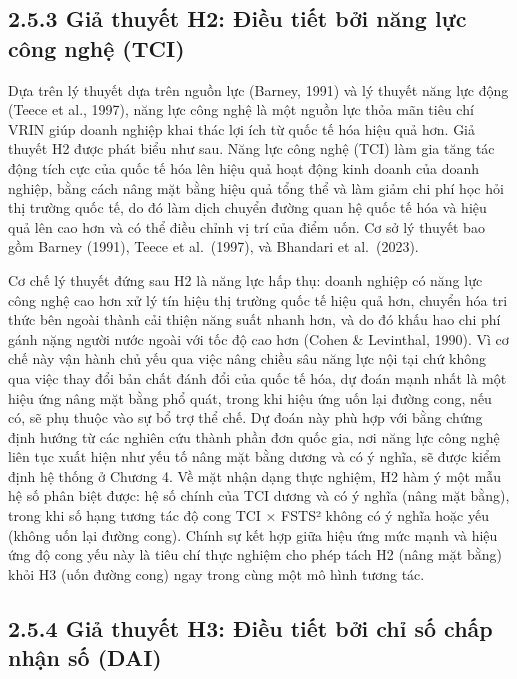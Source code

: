 \documentclass[
  a4paper,
  13pt]{extreport}
\begin{document}
\hypertarget{giux1ea3-thuyux1ebft-h2-ux111iux1ec1u-tiux1ebft-bux1edfi-nux103ng-lux1ef1c-cuxf4ng-nghux1ec7-tci}{%
\subsection{2.5.3 Giả thuyết H2: Điều tiết bởi năng lực công nghệ
(TCI)}\label{giux1ea3-thuyux1ebft-h2-ux111iux1ec1u-tiux1ebft-bux1edfi-nux103ng-lux1ef1c-cuxf4ng-nghux1ec7-tci}}

Dựa trên lý thuyết dựa trên nguồn lực (Barney, 1991) và lý thuyết năng
lực động (Teece et al., 1997), năng lực công nghệ là một nguồn lực thỏa
mãn tiêu chí VRIN giúp doanh nghiệp khai thác lợi ích từ quốc tế hóa
hiệu quả hơn. Giả thuyết H2 được phát biểu như sau. Năng lực công nghệ
(TCI) làm gia tăng tác động tích cực của quốc tế hóa lên hiệu quả hoạt
động kinh doanh của doanh nghiệp, bằng cách nâng mặt bằng hiệu quả tổng
thể và làm giảm chi phí học hỏi thị trường quốc tế, do đó làm dịch
chuyển đường quan hệ quốc tế hóa và hiệu quả lên cao hơn và có thể điều
chỉnh vị trí của điểm uốn. Cơ sở lý thuyết bao gồm Barney (1991), Teece
et al.~(1997), và Bhandari et al.~(2023).

Cơ chế lý thuyết đứng sau H2 là năng lực hấp thụ: doanh nghiệp có năng
lực công nghệ cao hơn xử lý tín hiệu thị trường quốc tế hiệu quả hơn,
chuyển hóa tri thức bên ngoài thành cải thiện năng suất nhanh hơn, và do
đó khấu hao chi phí gánh nặng người nước ngoài với tốc độ cao hơn (Cohen
\& Levinthal, 1990). Vì cơ chế này vận hành chủ yếu qua việc nâng chiều
sâu năng lực nội tại chứ không qua việc thay đổi bản chất đánh đổi của
quốc tế hóa, dự đoán mạnh nhất là một hiệu ứng nâng mặt bằng phổ quát,
trong khi hiệu ứng uốn lại đường cong, nếu có, sẽ phụ thuộc vào sự bổ
trợ thể chế. Dự đoán này phù hợp với bằng chứng định hướng từ các nghiên
cứu thành phần đơn quốc gia, nơi năng lực công nghệ liên tục xuất hiện
như yếu tố nâng mặt bằng dương và có ý nghĩa, sẽ được kiểm định hệ thống
ở Chương 4. Về mặt nhận dạng thực nghiệm, H2 hàm ý một mẫu hệ số phân
biệt được: hệ số chính của TCI dương và có ý nghĩa (nâng mặt bằng),
trong khi số hạng tương tác độ cong TCI × FSTS² không có ý nghĩa hoặc
yếu (không uốn lại đường cong). Chính sự kết hợp giữa hiệu ứng mức mạnh
và hiệu ứng độ cong yếu này là tiêu chí thực nghiệm cho phép tách H2
(nâng mặt bằng) khỏi H3 (uốn đường cong) ngay trong cùng một mô hình
tương tác.

\hypertarget{giux1ea3-thuyux1ebft-h3-ux111iux1ec1u-tiux1ebft-bux1edfi-chux1ec9-sux1ed1-chux1ea5p-nhux1eadn-sux1ed1-dai}{%
\subsection{2.5.4 Giả thuyết H3: Điều tiết bởi chỉ số chấp nhận số
(DAI)}\label{giux1ea3-thuyux1ebft-h3-ux111iux1ec1u-tiux1ebft-bux1edfi-chux1ec9-sux1ed1-chux1ea5p-nhux1eadn-sux1ed1-dai}}
\end{document}
